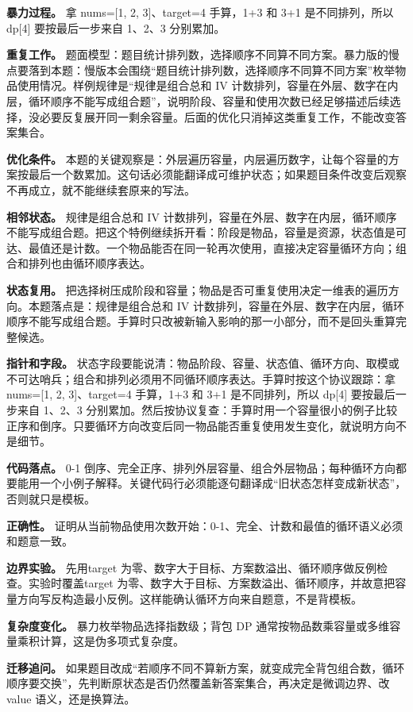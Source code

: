 \textbf{暴力过程。} 拿 nums=[1, 2, 3]、target=4 手算，1+3 和 3+1 是不同排列，所以 dp[4] 要按最后一步来自 1、2、3 分别累加。

\textbf{重复工作。} 题面模型：题目统计排列数，选择顺序不同算不同方案。暴力版的慢点要落到本题：慢版本会围绕“题目统计排列数，选择顺序不同算不同方案”枚举物品使用情况。样例规律是“规律是组合总和 IV 计数排列，容量在外层、数字在内层，循环顺序不能写成组合题”，说明阶段、容量和使用次数已经足够描述后续选择，没必要反复展开同一剩余容量。后面的优化只消掉这类重复工作，不能改变答案集合。

\textbf{优化条件。} 本题的关键观察是：外层遍历容量，内层遍历数字，让每个容量的方案按最后一个数累加。这句话必须能翻译成可维护状态；如果题目条件改变后观察不再成立，就不能继续套原来的写法。

\textbf{相邻状态。} 规律是组合总和 IV 计数排列，容量在外层、数字在内层，循环顺序不能写成组合题。把这个特例继续拆开看：阶段是物品，容量是资源，状态值是可达、最值还是计数。一个物品能否在同一轮再次使用，直接决定容量循环方向；组合和排列也由循环顺序表达。

\textbf{状态复用。} 把选择树压成阶段和容量；物品是否可重复使用决定一维表的遍历方向。本题落点是：规律是组合总和 IV 计数排列，容量在外层、数字在内层，循环顺序不能写成组合题。手算时只改被新输入影响的那一小部分，而不是回头重算完整候选。

\textbf{指针和字段。} 状态字段要能说清：物品阶段、容量、状态值、循环方向、取模或不可达哨兵；组合和排列必须用不同循环顺序表达。手算时按这个协议跟踪：拿 nums=[1, 2, 3]、target=4 手算，1+3 和 3+1 是不同排列，所以 dp[4] 要按最后一步来自 1、2、3 分别累加。然后按协议复查：手算时用一个容量很小的例子比较正序和倒序。只要循环方向改变后同一物品能否重复使用发生变化，就说明方向不是细节。

\textbf{代码落点。} 0-1 倒序、完全正序、排列外层容量、组合外层物品；每种循环方向都要能用一个小例子解释。关键代码行必须能逐句翻译成“旧状态怎样变成新状态”，否则就只是模板。

\textbf{正确性。} 证明从当前物品使用次数开始：0-1、完全、计数和最值的循环语义必须和题意一致。

\textbf{边界实验。} 先用target 为零、数字大于目标、方案数溢出、循环顺序做反例检查。实验时覆盖target 为零、数字大于目标、方案数溢出、循环顺序，并故意把容量方向写反构造最小反例。这样能确认循环方向来自题意，不是背模板。

\textbf{复杂度变化。} 暴力枚举物品选择指数级；背包 DP 通常按物品数乘容量或多维容量乘积计算，这是伪多项式复杂度。

\textbf{迁移追问。} 如果题目改成“若顺序不同不算新方案，就变成完全背包组合数，循环顺序要交换”，先判断原状态是否仍然覆盖新答案集合，再决定是微调边界、改 value 语义，还是换算法。

